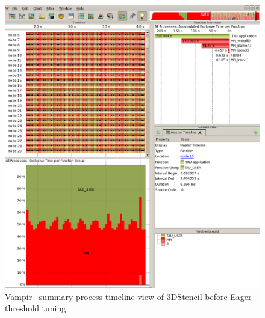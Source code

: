  \begin{figure}[tbp!]
  \centering
  \captionsetup{justification=centering}
  \includegraphics[scale=1.0,width=\columnwidth,keepaspectratio]{figures/Overlap-before}
         \caption{Vampir~\cite{Vampir} summary process timeline view of 3DStencil before Eager threshold tuning}
 \label{fig:beforeeager}
 \end{figure}

